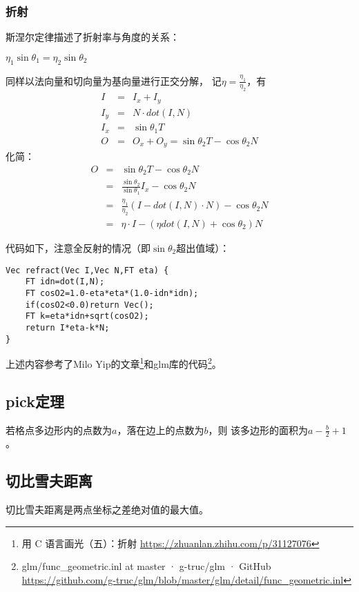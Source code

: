 \subsubsection{折射}
斯涅尔定律描述了折射率与角度的关系：
\begin{theorem}
    $\eta_1\sin \theta_1=\eta_2\sin \theta_2$
\end{theorem}
同样以法向量和切向量为基向量进行正交分解，
记$\eta=\frac{\eta_1}{\eta_2}$，有
\begin{eqnarray*}
    I&=&I_x+I_y\\
    I_y&=&N\cdot dot(I,N)\\
    I_x&=&\sin \theta_1T\\
    O&=&O_x+O_y=\sin \theta_2T-\cos \theta_2N
\end{eqnarray*}
化简：
\begin{eqnarray*}
    O&=&\sin \theta_2T-\cos \theta_2N\\
    &=&\frac{\sin \theta_2}{\sin \theta_1}I_x - \cos \theta_2 N\\
    &=&\frac{\eta_1}{\eta_2}(I-dot(I,N)\cdot N)-\cos \theta_2 N\\
    &=&\eta\cdot I-(\eta dot(I,N)+\cos \theta_2)N
\end{eqnarray*}

代码如下，注意全反射的情况（即$\sin \theta_2$超出值域）：
\begin{lstlisting}
Vec refract(Vec I,Vec N,FT eta) {
    FT idn=dot(I,N);
    FT cosO2=1.0-eta*eta*(1.0-idn*idn);
    if(cosO2<0.0)return Vec();
    FT k=eta*idn+sqrt(cosO2);
    return I*eta-k*N;
}
\end{lstlisting}
上述内容参考了Milo Yip的文章\footnote{
    用 C 语言画光（五）：折射
    \url{https://zhuanlan.zhihu.com/p/31127076}
}和glm库的代码\footnote{
    glm/func\_geometric.inl at master · g-truc/glm · GitHub
    \url{https://github.com/g-truc/glm/blob/master/glm/detail/func\_geometric.inl}
}。
\subsection{pick定理}
\begin{theorem}
    若格点多边形内的点数为$a$，落在边上的点数为$b$，则
    该多边形的面积为$a-\frac{b}{2}+1$。
\end{theorem}
\subsection{切比雪夫距离}
切比雪夫距离是两点坐标之差绝对值的最大值。

